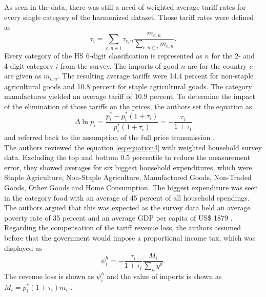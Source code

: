 As seen in the data, there was still a need of weighted average tariff rates for every single category of the harmonized 
dataset. Those tariff rates were defined as 
\begin{equation} \label{eq:equation9}
    \tau_{i}= \sum_{c,n \in i} \tau_{c,n} \frac{m_{c,n}}{\sum_{c,n \in i}m_{c,n}}.
\end{equation}
Every category of the HS 6-digit classification is represented as \(n\) for the 2- and 4-digit category \(i\) from the survey. 
The imports of good \(n\) are for the country \(c\) are given as \(m_{c,n}\). The resulting average tariffs were 14.4 percent
for non-staple agricultural goods and 10.8 percent for staple agricultural goods. The category manufactures yielded an
average tariff of 10.9 percent.
To determine the impact of the elimination of those tariffs on the prices, the authors set the equation as
\begin{equation} \label{eq:equation10}
    \Delta \ln p_{i} = \frac{p_{i}^*-p_{i}^*(1+\tau_{i})}{p_{i}^*(1+\tau_{i})} = -\frac{\tau_{i}}{1+\tau_{i}}
\end{equation}
and referred back to the assumption of the full price transmission \parencite[p.~11]{Artuc.2019}.\\

The authors reviewed the equation \ref{eq:equation4} with weighted household survey data. Excluding the top and bottom 
0.5 percentile to reduce the measurement error, they showed averages for six biggest household expenditures, which were
Staple Agriculture, Non-Staple Agriculture, Manufactured Goods, Non-Traded Goods, Other Goods and Home Consumption. The biggest
expenditure was seen in the category food with an average of 45 percent of all household spendings. The authors argued that this
was expected as the survey data held an average poverty rate of 35 percent and an average GDP per capita of US\$ 1879 \parencite[p.~12]{Artuc.2019}.\\

Regarding the compensation of the tariff revenue loss, the authors assumed before that the government would impose a proportional
income tax, which was displayed as 
\begin{equation} \label{eq:equation11}
    \psi_{i}^h = -\frac{\tau_ {i}}{1+\tau_{i}} \frac{M_{i}}{\sum_{h}y^h}.    
\end{equation}
The revenue loss is shown as \(\psi_{i}^h\) and the value of imports is shown as \(M_{i} = p_{i}^*(1+\tau_{i})m_{i}\) \parencite[p.~13]{Artuc.2019}.\\

